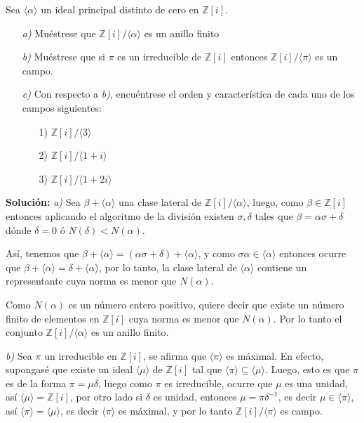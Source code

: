 Sea $\langle \alpha \rangle$ un ideal principal distinto de cero en $\mathbb{Z}[i]$.
    \begin{itemize}
    
        \item [\textit{a)}] Muéstrese que $\mathbb{Z}[i]/\langle \alpha \rangle$ es un anillo finito
        
        \item [\textit{b)}] Muéstrese que si $\pi$ es un irreducible de $\mathbb{Z}[i]$ entonces $\mathbb{Z}[i]/\langle \pi \rangle$ es un campo.

        \item [\textit{c)}] Con respecto a \textit{b)}, encuéntrese el orden y característica de cada uno de los campos siguientes:
        
        \begin{itemize}
            \item [1)] $\mathbb{Z}[i]/\langle 3 \rangle$
            
            \item [2)] $\mathbb{Z}[i]/\langle 1 + i \rangle$
            
            \item [3)] $\mathbb{Z}[i]/\langle 1 + 2i \rangle$
        \end{itemize}
    \end{itemize}

    \textbf{Solución:} \textit{a)} Sea $\beta + \langle \alpha \rangle$ una clase lateral de $\mathbb{Z}[i]/\langle \alpha \rangle$, luego, como $\beta \in \mathbb{Z}[i]$ entonces aplicando el algoritmo de la división existen $\sigma, \delta$ tales que $\beta = \alpha\sigma + \delta$ dónde $\delta = 0$ ó $N(\delta) < N(\alpha)$.

    Así, tenemos que $\beta + \langle \alpha \rangle = (\alpha\sigma + \delta) + \langle \alpha \rangle$, y como $\sigma\alpha \in \langle \alpha \rangle$ entonces ocurre que $\beta +\langle \alpha \rangle = \delta + \langle \alpha \rangle$, por lo tanto, la clase lateral de $\langle \alpha \rangle$ contiene un representante cuya norma es menor que $N(\alpha)$. \smallskip
    
    Como $N(\alpha)$ es un número entero positivo, quiere decir que existe un número finito de elementos en $\mathbb{Z}[i]$ cuya norma es menor que $N(\alpha)$. Por lo tanto el conjunto $\mathbb{Z}[i]/\langle \alpha \rangle$ es un anillo finito.

    \textit{b)} Sea $\pi$ un irreducible en $\mathbb{Z}[i]$, se afirma que $\langle \pi \rangle$ es máximal. En efecto, supongasé que existe un ideal $\langle \mu \rangle$ de $\mathbb{Z}[i]$ tal que $\langle \pi \rangle \subseteq \langle \mu \rangle$. Luego, esto es que $\pi$ es de la forma $\pi = \mu\delta$, luego como $\pi$ es irreducible, ocurre que $\mu$ es una unidad, así $\langle \mu \rangle = \mathbb{Z}[i]$, por otro lado si $\delta$ es unidad, entonces $\mu = \pi \delta^{-1}$, es decir $\mu \in \langle \pi \rangle$, así $\langle \pi \rangle = \langle \mu \rangle$, es decir $\langle \pi \rangle$ es máximal, y por lo tanto $\mathbb{Z}[i] / \langle \pi \rangle$ es campo.

